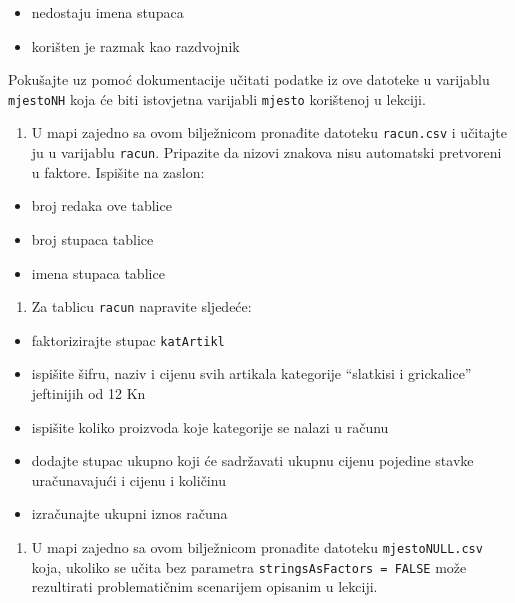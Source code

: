 \documentclass[]{book}
\providecommand{\tightlist}{%
  \setlength{\itemsep}{0pt}\setlength{\parskip}{0pt}}
\theoremstyle{definition}
\theoremstyle{definition}
\theoremstyle{definition}
\theoremstyle{remark}
\begin{document}
\begin{itemize}
\tightlist
\item
  nedostaju imena stupaca
\item
  korišten je razmak kao razdvojnik
\end{itemize}

Pokušajte uz pomoć dokumentacije učitati podatke iz ove datoteke u
varijablu \texttt{mjestoNH} koja će biti istovjetna varijabli
\texttt{mjesto} korištenoj u lekciji.

\begin{enumerate}
\def\labelenumi{\arabic{enumi}.}
\setcounter{enumi}{1}
\tightlist
\item
  U mapi zajedno sa ovom bilježnicom pronađite datoteku
  \texttt{racun.csv} i učitajte ju u varijablu \texttt{racun}. Pripazite
  da nizovi znakova nisu automatski pretvoreni u faktore. Ispišite na
  zaslon:
\end{enumerate}

\begin{itemize}
\tightlist
\item
  broj redaka ove tablice
\item
  broj stupaca tablice
\item
  imena stupaca tablice
\end{itemize}

\begin{enumerate}
\def\labelenumi{\arabic{enumi}.}
\setcounter{enumi}{2}
\tightlist
\item
  Za tablicu \texttt{racun} napravite sljedeće:
\end{enumerate}

\begin{itemize}
\tightlist
\item
  faktorizirajte stupac \texttt{katArtikl}
\item
  ispišite šifru, naziv i cijenu svih artikala kategorije ``slatkisi i
  grickalice'' jeftinijih od 12 Kn
\item
  ispišite koliko proizvoda koje kategorije se nalazi u računu
\item
  dodajte stupac ukupno koji će sadržavati ukupnu cijenu pojedine stavke
  uračunavajući i cijenu i količinu
\item
  izračunajte ukupni iznos računa
\end{itemize}

\begin{enumerate}
\def\labelenumi{\arabic{enumi}.}
\setcounter{enumi}{3}
\tightlist
\item
  U mapi zajedno sa ovom bilježnicom pronađite datoteku
  \texttt{mjestoNULL.csv} koja, ukoliko se učita bez parametra
  \texttt{stringsAsFactors\ =\ FALSE} može rezultirati problematičnim
  scenarijem opisanim u lekciji.
\end{enumerate}
\end{document}
